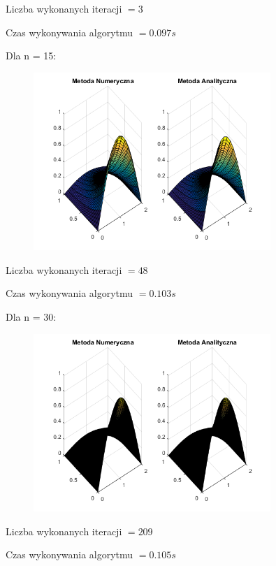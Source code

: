 Liczba wykonanych iteracji $ = 3 $

Czas wykonywania algorytmu $ = 0.097 s$

Dla n = 15:

\begin{figure}[!ht]
	\begin{center}
		\includegraphics[width=0.8\textwidth]{Lab7/charts/rm/15.png}
	\end{center}
\end{figure}

Liczba wykonanych iteracji $ = 48 $

Czas wykonywania algorytmu $ = 0.103 s$

Dla n = 30:

\begin{figure}[!ht]
	\begin{center}
		\includegraphics[width=0.8\textwidth]{Lab7/charts/rm/30.png}
	\end{center}
\end{figure}

Liczba wykonanych iteracji $ = 209 $

Czas wykonywania algorytmu $ = 0.105 s$
